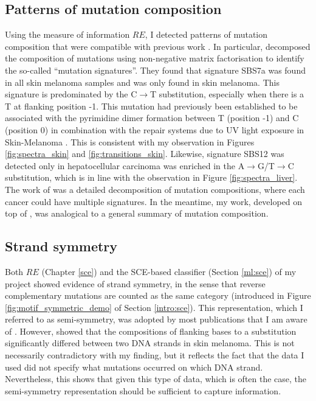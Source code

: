 \subsection{Patterns of mutation composition}
Using the measure of information $RE$, I detected patterns of mutation composition that were compatible with previous work \citep[Chapter \ref{sce};][]{Alexandrov2020}. In particular, \citet{Alexandrov2020} decomposed the composition of mutations using non-negative matrix factorisation to identify the so-called ``mutation signatures''. They found that signature SBS7a was found in all skin melanoma samples and was only found in skin melanoma. This signature is predominated by the C$\rightarrow$T substitution, especially when there is a T at flanking position -1. This mutation had previously been established to be associated with the pyrimidine dimer formation between T (position -1) and C (position 0) in combination with the repair systems due to UV light exposure in Skin-Melanoma \citep{Pfeifer2005MutationsLight}. This is consistent with my observation in Figures \ref{fig:spectra_skin} and \ref{fig:transitions_skin}. Likewise, signature SBS12 was detected only in hepatocellular carcinoma was enriched in the A$\rightarrow$G/T$\rightarrow$C substitution, which is in line with the observation in Figure \ref{fig:spectra_liver}. The work of \citet{Alexandrov2020} was a detailed decomposition of mutation compositions, where each cancer could have multiple signatures. In the meantime, my work, developed on top of \citet{Zhu2017}, was analogical to a general summary of mutation composition. 

\subsection{Strand symmetry}
Both $RE$ (Chapter \ref{sce}) and the SCE-based classifier (Section \ref{ml:sce}) of my project showed evidence of strand symmetry, in the sense that reverse complementary mutations are counted as the same category (introduced in Figure \ref{fig:motif_symmetric_demo} of Section \ref{intro:sce}). This representation, which I referred to as semi-symmetry, was adopted by most publications that I am aware of \citep{Alexandrov2020,Jiao2020,Zhang2020}. However, \citet{Zhu2017} showed that the compositions of flanking bases to a substitution significantly differed between two DNA strands in skin melanoma. This is not necessarily contradictory with my finding, but it reflects the fact that the data I used did not specify what mutations occurred on which DNA strand. Nevertheless, this shows that given this type of data, which is often the case, the semi-symmetry representation should be sufficient to capture information.

